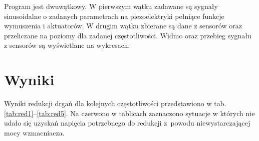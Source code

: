 \documentclass[polish,a4paper,11pt]{mwart}
\let\Oldsection\section
\renewcommand{\section}{\FloatBarrier\Oldsection}
\begin{document}
Program jest dwuwątkowy. W pierwszym wątku zadawane są sygnały sinusoidalne o
zadanych parametrach na piezoelektryki pełniące funkcje wymuszenia i
aktuatorów. W drugim wątku zbierane są dane z sensorów oraz przeliczane na
poziomy \si{\decibelV} dla zadanej częstotliwości. Widmo oraz przebieg sygnału
z sensorów są wyświetlane na wykresach.

\section{Wyniki}

Wyniki redukcji drgań dla kolejnych częstotliwości przedstawiono w tab.
\ref{tab:red1}--\ref{tab:red5}.  Na czerwono w tablicach zaznaczono sytuacje w
których nie udało się uzyskań napięcia potrzebnego do redukcji z~powodu
niewystarczającej mocy wzmacniacza.
\end{document}
